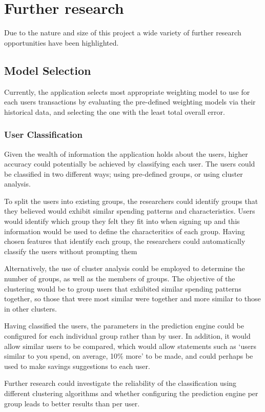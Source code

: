 \section{Further research}
Due to the nature and size of this project a wide variety of further research opportunities have been highlighted.

\subsection{Model Selection}
Currently, the application selects most appropriate weighting model to use for each users transactions by evaluating the pre-defined weighting models via their historical data, and selecting the one with the least total overall error.

\subsubsection{User Classification}
Given the wealth of information the application holds about the users, higher accuracy could potentially be achieved by classifying each user. The users could be classified in two different ways; using pre-defined groups, or using cluster analysis. 

To split the users into existing groups, the researchers could identify groups that they believed would exhibit similar spending patterns and characteristics. Users would identify which group they felt they fit into when signing up and this information would be used to define the characteritics of each group. Having chosen features that identify each group, the researchers could automatically classify the users without prompting them

Alternatively, the use of cluster analysis could be employed to determine the number of groups, as well as the members of groups. The objective of the clustering would be to group users that exhibited similar spending patterns together, so those that were most similar were together and more similar to those in other clusters. 

Having classified the users, the parameters in the prediction engine could be configured for each individual group rather than by user. In addition, it would allow similar users to be compared, which would allow statements such as `users similar to you spend, on average, 10\% more' to be made, and could perhaps be used to make savings suggestions to each user.  

Further research could investigate the reliability of the classification using different clustering algorithms and whether configuring the prediction engine per group leads to better results than per user.

